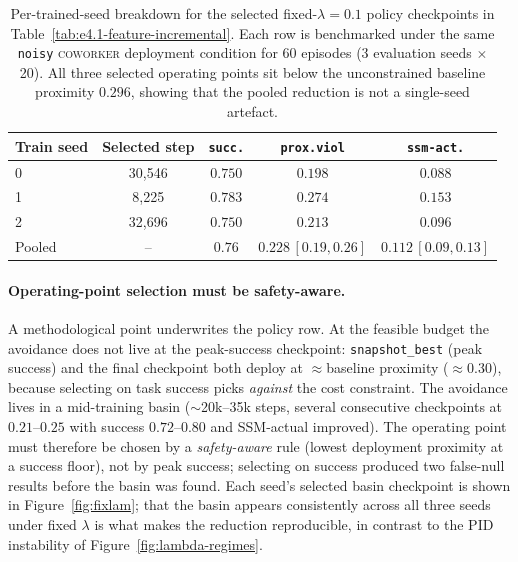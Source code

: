 \documentclass[11pt,a4paper]{report}
\newcommand{\ssm}{SSM}
\newcommand{\coworker}{\textsc{coworker}}
\begin{document}
\begin{table}[h]
\centering
\caption{Per-trained-seed breakdown for the selected fixed-$\lambda =
0.1$ policy checkpoints in Table~\ref{tab:e4.1-feature-incremental}.
Each row is benchmarked under the same \texttt{noisy}
\coworker{} deployment condition for 60 episodes (3 evaluation seeds
$\times$ 20). All three selected operating points sit below the
unconstrained baseline proximity $0.296$, showing that the pooled
reduction is not a single-seed artefact.}
\label{tab:e4.1-row3-seeds}
\small
\begin{tabular}{lcccc}
\toprule
Train seed & Selected step & \texttt{succ.} & \texttt{prox.viol} & \texttt{ssm-act.} \\
\midrule
0 & 30{,}546 & $0.750$ & $0.198$ & $0.088$ \\
1 & 8{,}225  & $0.783$ & $0.274$ & $0.153$ \\
2 & 32{,}696 & $0.750$ & $0.213$ & $0.096$ \\
\midrule
Pooled & -- & $0.76$ & $0.228\,[0.19,0.26]$ & $0.112\,[0.09,0.13]$ \\
\bottomrule
\end{tabular}
\end{table}

\paragraph{Operating-point selection must be safety-aware.}
A methodological point underwrites the policy row. At the feasible
budget the avoidance does not live at the peak-success checkpoint:
\texttt{snapshot\_best} (peak success) and the final checkpoint both
deploy at $\approx$baseline proximity ($\approx$0.30), because
selecting on task success picks \emph{against} the cost constraint. The
avoidance lives in a mid-training basin ($\sim$20k--35k steps, several
consecutive checkpoints at $0.21$--$0.25$ with success $0.72$--$0.80$
and \ssm{}-actual improved). The operating point must therefore be
chosen by a \emph{safety-aware} rule (lowest deployment proximity at a
success floor), not by peak success; selecting on success produced two
false-null results before the basin was found. Each seed's selected
basin checkpoint is shown in Figure~\ref{fig:fixlam}; that the basin
appears consistently across all three seeds under fixed $\lambda$ is
what makes the reduction reproducible, in contrast to the PID
instability of Figure~\ref{fig:lambda-regimes}.
\end{document}
